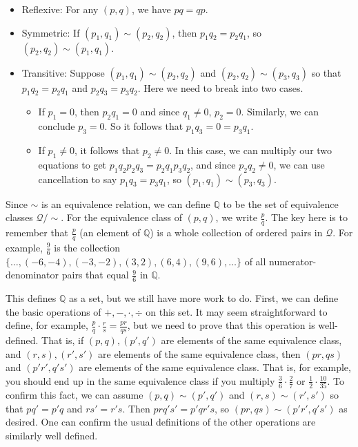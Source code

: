 \documentclass[
  letterpaper,
  DIV=11,
  numbers=noendperiod]{scrreprt}
\providecommand{\tightlist}{%
  \setlength{\itemsep}{0pt}\setlength{\parskip}{0pt}}
\def\Q{\mathbb Q}
\theoremstyle{plain}
\theoremstyle{definition}
\theoremstyle{plain}
\theoremstyle{plain}
\theoremstyle{definition}
\theoremstyle{definition}
\theoremstyle{remark}
\begin{document}
\begin{itemize}
\tightlist
\item
  Reflexive: For any \((p,q)\), we have \(pq=qp\).
\item
  Symmetric: If \((p_1,q_1)\sim(p_2,q_2)\), then \(p_1q_2=p_2q_1\), so
  \((p_2,q_2)\sim(p_1,q_1)\).
\item
  Transitive: Suppose \((p_1,q_1)\sim(p_2,q_2)\) and
  \((p_2,q_2)\sim(p_3,q_3)\) so that \(p_1q_2=p_2q_1\) and
  \(p_2q_3=p_3q_2\). Here we need to break into two cases.

  \begin{itemize}
  \tightlist
  \item
    If \(p_1=0\), then \(p_2q_1=0\) and since \(q_1\neq0\), \(p_2=0\).
    Similarly, we can conclude \(p_3=0\). So it follows that
    \(p_1q_3=0=p_3q_1\).
  \item
    If \(p_1\neq0\), it follows that \(p_2\neq0\). In this case, we can
    multiply our two equations to get \(p_1q_2p_2q_3=p_2q_1p_3q_2\), and
    since \(p_2q_2\neq0\), we can use cancellation to say
    \(p_1q_3=p_3q_1\), so \((p_1,q_1)\sim(p_3,q_3)\).
  \end{itemize}
\end{itemize}

Since \(\sim\) is an equivalence relation, we can define \(\Q\) to be
the set of equivalence classes \(\mathcal Q/\sim\). For the equivalence
class of \((p,q)\), we write \(\frac{p}{q}\). The key here is to
remember that \(\frac{p}{q}\) (an element of \(\Q\)) is a whole
collection of ordered pairs in \(\mathcal Q\). For example,
\(\frac{9}{6}\) is the collection
\(\{\ldots,(-6,-4),(-3,-2),(3,2),(6,4),(9,6),\ldots\}\) of all
numerator-denominator pairs that equal \(\frac{9}{6}\) in \(\Q\).

This defines \(\Q\) as a set, but we still have more work to do. First,
we can define the basic operations of \(+,-,\cdot,\div\) on this set. It
may seem straightforward to define, for example,
\(\frac{p}{q}\cdot\frac{r}{s}=\frac{pr}{qs}\), but we need to prove that
this operation is well-defined. That is, if \((p,q),(p',q')\) are
elements of the same equivalence class, and \((r,s),(r',s')\) are
elements of the same equivalence class, then \((pr,qs)\) and
\((p'r',q's')\) are elements of the same equivalence class. That is, for
example, you should end up in the same equivalence class if you multiply
\(\frac{3}{6}\cdot\frac{2}{7}\) or \(\frac{1}{2}\cdot\frac{10}{35}\). To
confirm this fact, we can assume \((p,q)\sim(p',q')\) and
\((r,s)\sim(r',s')\) so that \(pq'=p'q\) and \(rs'=r's\). Then
\(prq's'=p'qr's\), so \((pr,qs)\sim(p'r',q's')\) as desired. One can
confirm the usual definitions of the other operations are similarly well
defined.
\end{document}

